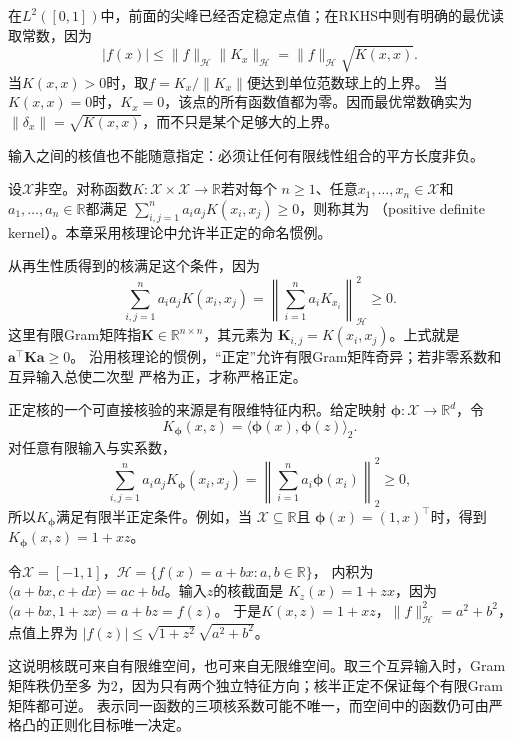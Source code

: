 在$L^2([0,1])$中，前面的尖峰已经否定稳定点值；在RKHS中则有明确的最优读取常数，因为
\begin{equation}
  |f(x)|
  \leq
  \lVert f\rVert_{\mathcal{H}}
  \lVert K_x\rVert_{\mathcal{H}}
  =
  \lVert f\rVert_{\mathcal{H}}\sqrt{K(x,x)}.
  \label{eq:functional-rkhs-pointwise-bound}
\end{equation}
当$K(x,x)>0$时，取$f=K_x/\lVert K_x\rVert$便达到单位范数球上的上界。
当$K(x,x)=0$时，$K_x=0$，该点的所有函数值都为零。因而最优常数确实为
$\lVert\delta_x\rVert=\sqrt{K(x,x)}$，而不只是某个足够大的上界。

输入之间的核值也不能随意指定：必须让任何有限线性组合的平方长度非负。
\begin{definition}[实正定核]
\label{def:functional-positive-definite-kernel}
设$\mathcal X$非空。对称函数$K:\mathcal X\times\mathcal X\to\mathbb R$若对每个
$n\geq1$、任意$x_1,\ldots,x_n\in\mathcal X$和$a_1,\ldots,a_n\in\mathbb R$都满足
$\sum_{i,j=1}^n a_i a_jK(x_i,x_j)\geq0$，则称其为
（positive definite kernel）。本章采用核理论中允许半正定的命名惯例。
\end{definition}
从再生性质得到的核满足这个条件，因为
\begin{equation}
  \sum_{i,j=1}^{n}a_i a_jK(x_i,x_j)
  =
  \left\lVert\sum_{i=1}^{n}a_iK_{x_i}\right\rVert_{\mathcal{H}}^2
  \geq0.
  \label{eq:functional-positive-definite-kernel}
\end{equation}
这里有限Gram矩阵指$\bm K\in\mathbb R^{n\times n}$，其元素为
$\bm K_{i,j}=K(x_i,x_j)$。上式就是$\bm a^\top\bm K\bm a\geq0$。
沿用核理论的惯例，“正定”允许有限Gram矩阵奇异；若非零系数和互异输入总使二次型
严格为正，才称严格正定。

正定核的一个可直接核验的来源是有限维特征内积。给定映射
$\bm{\phi}:\mathcal{X}\to\mathbb{R}^d$，令
\[
  K_{\bm{\phi}}(x,z)
  =
  \langle\bm{\phi}(x),\bm{\phi}(z)\rangle_2.
\]
对任意有限输入与实系数，
\[
  \sum_{i,j=1}^{n}a_i a_jK_{\bm{\phi}}(x_i,x_j)
  =
  \left\lVert
    \sum_{i=1}^{n}a_i\bm{\phi}(x_i)
  \right\rVert_2^2
  \geq0,
\]
所以$K_{\bm{\phi}}$满足有限半正定条件。例如，当
$\mathcal{X}\subseteq\mathbb{R}$且
$\bm{\phi}(x)=(1,x)^{\top}$时，得到$K_{\bm{\phi}}(x,z)=1+xz$。

\begin{example}[二维函数空间中的再生核]
\label{ex:functional-affine-rkhs}
令$\mathcal X=[-1,1]$，$\mathcal H=\{f(x)=a+bx:a,b\in\mathbb R\}$，
内积为$\langle a+bx,c+dx\rangle=ac+bd$。输入$z$的核截面是
$K_z(x)=1+zx$，因为$\langle a+bx,1+zx\rangle=a+bz=f(z)$。
于是$K(x,z)=1+xz$，$\lVert f\rVert_{\mathcal H}^2=a^2+b^2$，点值上界为
$|f(z)|\leq\sqrt{1+z^2}\sqrt{a^2+b^2}$。

这说明核既可来自有限维空间，也可来自无限维空间。取三个互异输入时，Gram矩阵秩仍至多
为$2$，因为只有两个独立特征方向；核半正定不保证每个有限Gram矩阵都可逆。
表示同一函数的三项核系数可能不唯一，而空间中的函数仍可由严格凸的正则化目标唯一决定。
\end{example}

